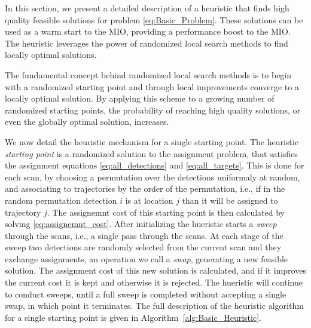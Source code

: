 In this section, we present a detailed description of a heuristic that finds high quality feasible solutions for problem \eqref{eq:Basic_Problem}. These solutions can be used as a warm start to the MIO, providing a performance boost to the MIO. The heuristic leverages the power of randomized local search methods to find locally optimal solutions. 

The fundamental concept behind randomized local search methods is to begin with a randomized starting point and through local improvements converge to a locally optimal solution. By applying this scheme to a growing number of randomized starting points, the probability of reaching high quality solutions, or even the globally optimal solution, increases.

We now detail the heuristic mechanism for a single starting point. The heuristic \textit{starting point} is a randomized solution to the assignment problem, that satisfies the assignment equations \eqref{eq:all_detections} and \eqref{eq:all_targets}. This is done for each scan, by choosing a permutation over the detections uniformaly at random, and associating to trajectories by the order of the permutation, i.e., if in the random permutation detection $i$ is at location $j$ than it will be assigned to trajectory $j$. The assignemnt cost of this starting point is then calculated by solving \eqref{eq:assignemnt_cost}. 
After initializing the hueristic starts a \textit{sweep} through the scans, i.e., a single pass through the scans. At each stage of the sweep two detections are randomly selected from the current scan and they exchange assignments, an operation we call a \textit{swap}, generating a new feasible solution. The assignment cost of this new solution is calculated, and if it improves the current cost it is kept and otherwise it is rejected. The hueristic will continue to conduct sweeps, until a full sweep is completed without accepting a single swap, in which point it terminates. The full description of the heuristic algorithm for a single starting point is given in Algorithm~\ref{alg:Basic_Heuristic}.





